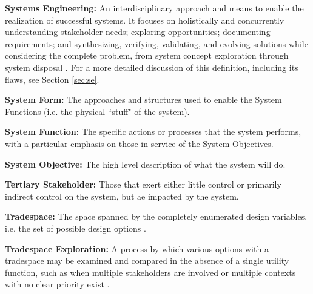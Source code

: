 \textbf{Systems Engineering:} An interdisciplinary approach and means to enable the realization of successful systems. It focuses on holistically and concurrently understanding stakeholder needs; exploring opportunities; documenting requirements; and synthesizing, verifying, validating, and evolving solutions while considering the complete problem, from system concept exploration through system disposal \cite{systemsengineeringbodyofknowledgeSystemsEngineeringGlossary2021}. 
For a more detailed discussion of this definition, including its flaws, see Section \ref{sec:se}.

\textbf{System Form:} The approaches and structures used to enable the System Functions (i.e. the physical ``stuff" of the system).

\textbf{System Function:} The specific actions or processes that the system performs, with a particular emphasis on those in service of the System Objectives.

\textbf{System Objective:} The high level description of what the system will do.

\textbf{Tertiary Stakeholder:} Those that exert either little control or primarily indirect control on the system, but ae impacted by the system.

\textbf{Tradespace:}  The space spanned by the completely enumerated design variables, i.e. the set of possible design options \cite{rossTradespaceExplorationParadigm2005}.

\textbf{Tradespace Exploration:} A process by which various options with a tradespace may be examined and compared in the absence of a single utility function, such as when multiple stakeholders are involved or multiple contexts with no clear priority exist \cite{rossTradespaceExplorationParadigm2005}.

\clearpage
\newpage
